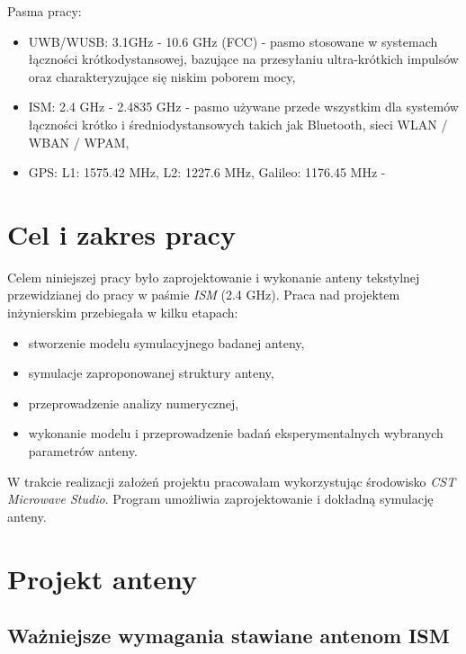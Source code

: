 Pasma pracy:

\begin{itemize}\setlength{\itemsep}{0pt}
	
	\item UWB/WUSB: 3.1GHz - 10.6 GHz (FCC) - pasmo stosowane w systemach łączności krótkodystansowej, bazujące na przesyłaniu ultra-krótkich impulsów oraz charakteryzujące się niskim poborem mocy,

	\item ISM: 2.4 GHz - 2.4835 GHz - pasmo używane przede wszystkim dla systemów łączności krótko i średniodystansowych takich jak Bluetooth, sieci WLAN / WBAN / WPAM,

	\item GPS: L1: 1575.42 MHz, L2: 1227.6 MHz, Galileo: 1176.45 MHz - 

\end{itemize}













 \chapter{Cel i zakres pracy}

Celem niniejszej pracy było zaprojektowanie i wykonanie anteny tekstylnej przewidzianej do pracy w paśmie \emph{ISM} (2.4 GHz). 
Praca nad projektem inżynierskim przebiegała w kilku etapach:

\begin{itemize}\setlength{\itemsep}{0pt}
	
	\item stworzenie modelu symulacyjnego badanej anteny,

	\item symulacje zaproponowanej struktury anteny,

	\item przeprowadzenie analizy numerycznej,

	\item wykonanie modelu i przeprowadzenie badań eksperymentalnych wybranych parametrów anteny.

\end{itemize}

W trakcie realizacji założeń projektu pracowałam wykorzystując środowisko \emph{CST Microwave Studio}. Program umożliwia zaprojektowanie i dokładną symulację anteny.   





\chapter {Projekt anteny}

\section{Ważniejsze wymagania stawiane antenom ISM}










	